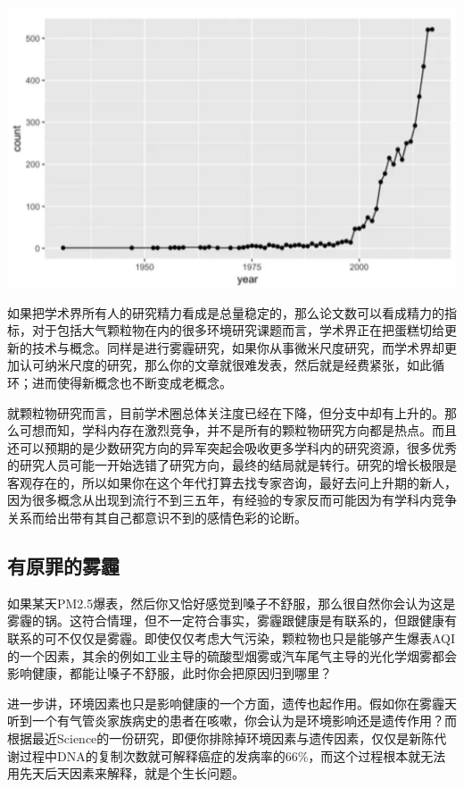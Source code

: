 \documentclass[]{book}
\begin{document}
\includegraphics[width=6.67in]{images/cw3}

如果把学术界所有人的研究精力看成是总量稳定的，那么论文数可以看成精力的指标，对于包括大气颗粒物在内的很多环境研究课题而言，学术界正在把蛋糕切给更新的技术与概念。同样是进行雾霾研究，如果你从事微米尺度研究，而学术界却更加认可纳米尺度的研究，那么你的文章就很难发表，然后就是经费紧张，如此循环；进而使得新概念也不断变成老概念。

就颗粒物研究而言，目前学术圈总体关注度已经在下降，但分支中却有上升的。那么可想而知，学科内存在激烈竞争，并不是所有的颗粒物研究方向都是热点。而且还可以预期的是少数研究方向的异军突起会吸收更多学科内的研究资源，很多优秀的研究人员可能一开始选错了研究方向，最终的结局就是转行。研究的增长极限是客观存在的，所以如果你在这个年代打算去找专家咨询，最好去问上升期的新人，因为很多概念从出现到流行不到三五年，有经验的专家反而可能因为有学科内竞争关系而给出带有其自己都意识不到的感情色彩的论断。

\hypertarget{ux6709ux539fux7f6aux7684ux96feux973e}{%
\subsection{有原罪的雾霾}\label{ux6709ux539fux7f6aux7684ux96feux973e}}

如果某天PM2.5爆表，然后你又恰好感觉到嗓子不舒服，那么很自然你会认为这是雾霾的锅。这符合情理，但不一定符合事实，雾霾跟健康是有联系的，但跟健康有联系的可不仅仅是雾霾。即使仅仅考虑大气污染，颗粒物也只是能够产生爆表AQI的一个因素，其余的例如工业主导的硫酸型烟雾或汽车尾气主导的光化学烟雾都会影响健康，都能让嗓子不舒服，此时你会把原因归到哪里？

进一步讲，环境因素也只是影响健康的一个方面，遗传也起作用。假如你在雾霾天听到一个有气管炎家族病史的患者在咳嗽，你会认为是环境影响还是遗传作用？而根据最近Science的一份研究，即便你排除掉环境因素与遗传因素，仅仅是新陈代谢过程中DNA的复制次数就可解释癌症的发病率的66\%，而这个过程根本就无法用先天后天因素来解释，就是个生长问题。
\end{document}
